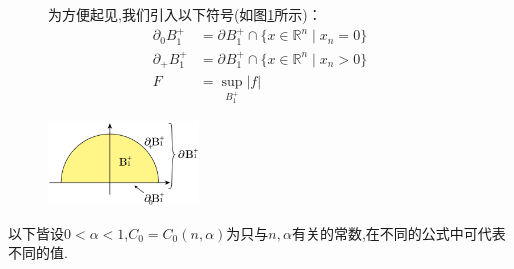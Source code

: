\documentclass[12pt,A4paper,reqno]{amsart}
\numberwithin{equation}{section}
\theoremstyle{plain}
\theoremstyle{plain}
\theoremstyle{plain}
\numberwithin{equation}{section}
\theoremstyle{remark}
\newcommand*{\pa}[2]{\partial_{#1}B_{#2}^+}
\begin{document}
	\begin{figure}[ht]
	\begin{minipage}[b]{.50\textwidth}
		为方便起见,我们引入以下符号(如图\ref{fig1}所示)：
		\begin{align*}
		\pa{0}{1}&=\pa{ }{1} \cap \{x \in \mathbb{R}^n \mid x_n=0\}\\
		\pa{+}{1}&=\pa{ }{1} \cap \{x \in \mathbb{R}^n \mid x_n>0\}\\
		F&=\sup _{B_{1}^{+}} |f|
		\end{align*}
	\end{minipage}
	\begin{minipage}[b]{.33\textwidth}
		\centering
		\includegraphics[width=4cm]{figures/figure1-01.png}
		\caption{}
		\label{fig1}
	\end{minipage}
\end{figure}
以下皆设$0< \alpha <1$,$C_0=C_0(n,\alpha)$为只与$n,\alpha$有关的常数,在不同的公式中可代表不同的值.

\end{document}
